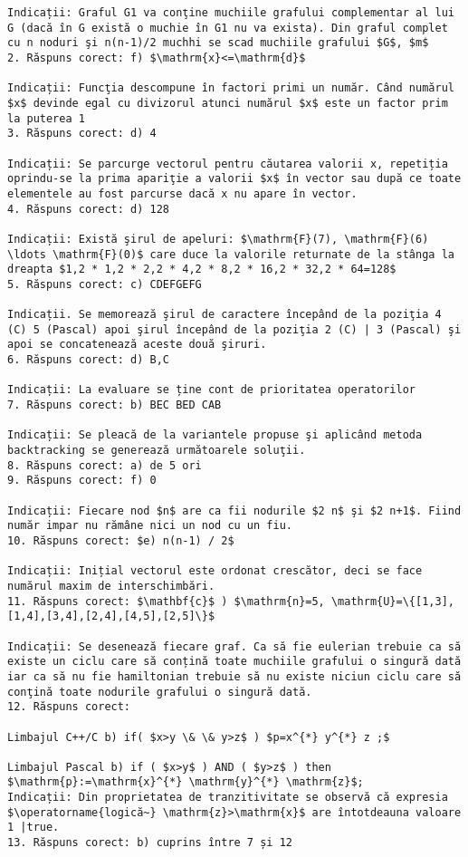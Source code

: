 \begin{verbatim}
Indicații: Graful G1 va conţine muchiile grafului complementar al lui G (dacă în G există o muchie în G1 nu va exista). Din graful complet cu n noduri şi n(n-1)/2 muchhi se scad muchiile grafului $G$, $m$
2. Răspuns corect: f) $\mathrm{x}<=\mathrm{d}$

Indicații: Funcţia descompune în factori primi un număr. Când numărul $x$ devinde egal cu divizorul atunci numărul $x$ este un factor prim la puterea 1
3. Răspuns corect: d) 4

Indicații: Se parcurge vectorul pentru căutarea valorii x, repetiția oprindu-se la prima apariţie a valorii $x$ în vector sau după ce toate elementele au fost parcurse dacă x nu apare în vector.
4. Răspuns corect: d) 128

Indicații: Există şirul de apeluri: $\mathrm{F}(7), \mathrm{F}(6) \ldots \mathrm{F}(0)$ care duce la valorile returnate de la stânga la dreapta $1,2 * 1,2 * 2,2 * 4,2 * 8,2 * 16,2 * 32,2 * 64=128$
5. Răspuns corect: c) CDEFGEFG

Indicații. Se memorează şirul de caractere începând de la poziţia 4 (C) 5 (Pascal) apoi şirul începând de la poziţia 2 (C) | 3 (Pascal) şi apoi se concatenează aceste două şiruri.
6. Răspuns corect: d) B,C

Indicații: La evaluare se ține cont de prioritatea operatorilor
7. Răspuns corect: b) BEC BED CAB

Indicații: Se pleacă de la variantele propuse şi aplicând metoda backtracking se generează următoarele soluţii.
8. Răspuns corect: a) de 5 ori
9. Răspuns corect: f) 0

Indicații: Fiecare nod $n$ are ca fii nodurile $2 n$ şi $2 n+1$. Fiind număr impar nu rămâne nici un nod cu un fiu.
10. Răspuns corect: $e) n(n-1) / 2$

Indicații: Inițial vectorul este ordonat crescător, deci se face numărul maxim de interschimbări.
11. Răspuns corect: $\mathbf{c}$ ) $\mathrm{n}=5, \mathrm{U}=\{[1,3],[1,4],[3,4],[2,4],[4,5],[2,5]\}$

Indicații: Se desenează fiecare graf. Ca să fie eulerian trebuie ca să existe un ciclu care să conțină toate muchiile grafului o singură dată iar ca să nu fie hamiltonian trebuie să nu existe niciun ciclu care să conţină toate nodurile grafului o singură dată.
12. Răspuns corect:

Limbajul C++/C b) if( $x>y \& \& y>z$ ) $p=x^{*} y^{*} z ;$

Limbajul Pascal b) if ( $x>y$ ) AND ( $y>z$ ) then $\mathrm{p}:=\mathrm{x}^{*} \mathrm{y}^{*} \mathrm{z}$;
Indicații: Din proprietatea de tranzitivitate se observă că expresia $\operatorname{logică~} \mathrm{z}>\mathrm{x}$ are întotdeauna valoare 1 |true.
13. Răspuns corect: b) cuprins între 7 și 12


\end{verbatim}
